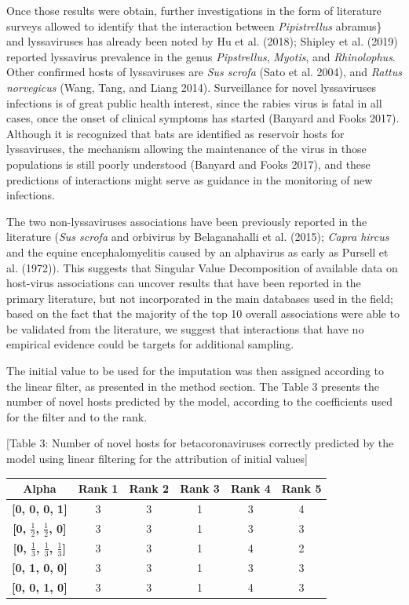 \documentclass[10pt,oneside]{article}
\begin{document}
Once those results were obtain, further investigations in the form of
literature surveys allowed to identify that the interaction between
\emph{Pipistrellus} abramus\} and lyssaviruses has already been noted by
Hu et al. (2018); Shipley et al. (2019) reported lyssavirus prevalence
in the genus \emph{Pipstrellus}, \emph{Myotis}, and \emph{Rhinolophus}.
Other confirmed hosts of lyssaviruses are \emph{Sus scrofa} (Sato et al.
2004), and \emph{Rattus norvegicus} (Wang, Tang, and Liang 2014).
Surveillance for novel lyssaviruses infections is of great public health
interest, since the rabies virus is fatal in all cases, once the onset
of clinical symptoms has started (Banyard and Fooks 2017). Although it
is recognized that bats are identified as reservoir hosts for
lyssaviruses, the mechanism allowing the maintenance of the virus in
those populations is still poorly understood (Banyard and Fooks 2017),
and these predictions of interactions might serve as guidance in the
monitoring of new infections.

The two non-lyssaviruses associations have been previously reported in
the literature (\emph{Sus scrofa} and orbivirus by Belaganahalli et al.
(2015); \emph{Capra hircus} and the equine encephalomyelitis caused by
an alphavirus as early as Pursell et al. (1972)). This suggests that
Singular Value Decomposition of available data on host-virus
associations can uncover results that have been reported in the primary
literature, but not incorporated in the main databases used in the
field; based on the fact that the majority of the top 10 overall
associations were able to be validated from the literature, we suggest
that interactions that have no empirical evidence could be targets for
additional sampling.

The initial value to be used for the imputation was then assigned
according to the linear filter, as presented in the method section. The
Table 3 presents the number of novel hosts predicted by the model,
according to the coefficients used for the filter and to the rank.

{[}Table 3: Number of novel hosts for betacoronaviruses correctly
predicted by the model using linear filtering for the attribution of
initial values{]}

\begin{longtable}[]{@{}cccccc@{}}
\toprule
Alpha & Rank 1 & Rank 2 & Rank 3 & Rank 4 & Rank 5\tabularnewline
\midrule
\endhead
\textbf{{[}0, 0, 0, 1{]}} & 3 & 3 & 1 & 3 & 4\tabularnewline
\textbf{{[}0, \(\frac{1}{2}\), \(\frac{1}{2}\), 0{]}} & 3 & 3 & 1 & 3 &
3\tabularnewline
\textbf{{[}0, \(\frac{1}{3}\), \(\frac{1}{3}\), \(\frac{1}{3}\){]}} & 3
& 3 & 1 & 4 & 2\tabularnewline
\textbf{{[}0, 1, 0, 0{]}} & 3 & 3 & 1 & 3 & 3\tabularnewline
\textbf{{[}0, 0, 1, 0{]}} & 3 & 3 & 1 & 4 & 3\tabularnewline
\bottomrule
\end{longtable}
\end{document}
